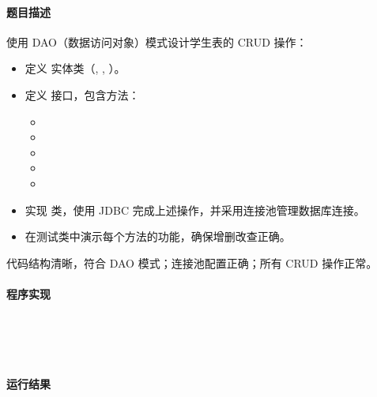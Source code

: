 \documentclass{academics}
\begin{document}
\paragraph{题目描述} {
    使用 DAO（数据访问对象）模式设计学生表的 CRUD 操作：
    \begin{itemize}
        \item 定义  实体类（, , ）。
        \item 定义  接口，包含方法：
        \begin{itemize}
            \item {}
            \item {}
            \item {}
            \item {}
            \item {}
        \end{itemize}
        \item 实现  类，使用 JDBC 完成上述操作，并采用连接池管理数据库连接。
        \item 在测试类中演示每个方法的功能，确保增删改查正确。
    \end{itemize}
    代码结构清晰，符合 DAO 模式；连接池配置正确；所有 CRUD 操作正常。
}

\paragraph{程序实现} {
    \inputminted[label=Student.java]{java}{../src/P06/Student.java}
    \inputminted[label=StudentDAO.java]{java}{../src/P06/StudentDAO.java}
    \inputminted[label=StudentDAOImpl.java]{java}{../src/P06/StudentDAOImpl.java}
    \inputminted[label=SimpleConnectionPool.java]{java}{../src/P06/SimpleConnectionPool.java}
    \inputminted[label=StudentDaoTest.java]{java}{../src/P06/StudentDaoTest.java}
}

\paragraph{运行结果} {
    \inputminted{text}{../res/P06.out}
}
\end{document}
